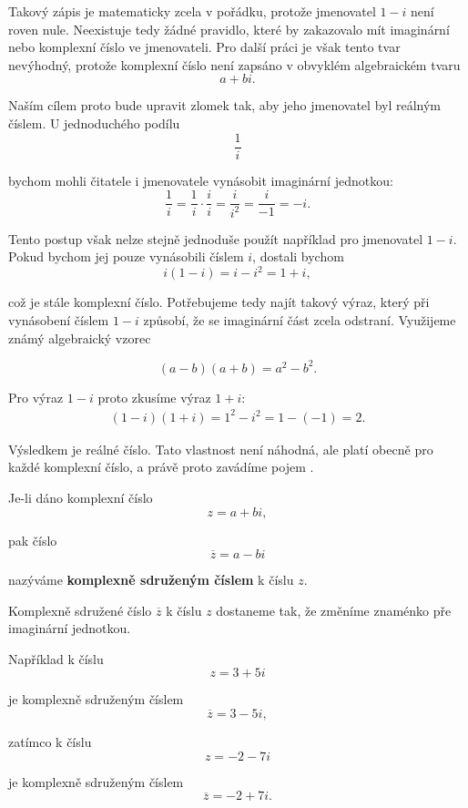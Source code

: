 \documentclass[12pt,a4paper]{article}
\begin{document}
Takový zápis je matematicky zcela v pořádku, protože jmenovatel $1-i$ není roven nule. 
Neexistuje tedy žádné pravidlo, které by zakazovalo mít imaginární 
nebo komplexní číslo ve jmenovateli. 
Pro další práci je však tento tvar nevýhodný,
protože komplexní číslo není zapsáno v obvyklém algebraickém tvaru
\[
    a+bi.
\]

Naším cílem proto bude upravit zlomek tak, aby jeho jmenovatel byl reálným číslem.
U jednoduchého podílu
\[
    \frac{1}{i}
\]

bychom mohli čitatele i jmenovatele vynásobit imaginární jednotkou:
\[
    \frac{1}{i} = \frac{1}{i} \cdot \frac{i}{i} = \frac{i}{i^2} = \frac{i}{-1} = -i.
\]

Tento postup však nelze stejně jednoduše použít například pro jmenovatel $1-i$.
Pokud bychom jej pouze vynásobili číslem $i$, dostali bychom
\[
    i(1-i)=i-i^2=1+i,
\]

což je stále komplexní číslo. Potřebujeme tedy najít takový výraz, 
který při vynásobení číslem $1-i$ způsobí, že se imaginární část zcela odstraní.
Využijeme známý algebraický vzorec

\[
    (a-b)(a+b)=a^2-b^2.
\]

Pro výraz $1-i$ proto zkusíme výraz $1+i$:
\begin{align*}
    (1-i)(1+i) = 1^2-i^2 = 1-(-1) = 2.
\end{align*}

Výsledkem je reálné číslo. Tato vlastnost není náhodná, 
ale platí obecně pro každé komplexní číslo, 
a právě proto zavádíme pojem .

\begin{definitionbox}
    Je-li dáno komplexní číslo
    \[
        z=a+bi,
    \]

    pak číslo
    \[
        \overline{z}=a-bi
    \]

    nazýváme \textbf{komplexně sdruženým číslem} k číslu $z$.
\end{definitionbox}

Komplexně sdružené číslo $\overline{z}$ k číslu $z$ dostaneme tak, 
že změníme znaménko pře imaginární jednotkou.

Například k číslu
\[
    z=3+5i
\]

je komplexně sdruženým číslem
\[
    \overline{z}=3-5i,
\]

zatímco k číslu
\[
    z=-2-7i
\]

je komplexně sdruženým číslem
\[
    \overline{z}=-2+7i.
\]
\end{document}
